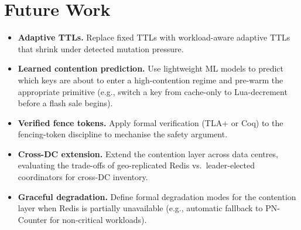 \documentclass[12pt,a4paper,oneside]{report}
\begin{document}
\section{Future Work}
\begin{itemize}[leftmargin=*]
    \item \textbf{Adaptive TTLs.} Replace fixed TTLs with workload-aware adaptive TTLs that shrink under detected mutation pressure.
    \item \textbf{Learned contention prediction.} Use lightweight ML models to predict which keys are about to enter a high-contention regime and pre-warm the appropriate primitive (e.g., switch a key from cache-only to Lua-decrement before a flash sale begins).
    \item \textbf{Verified fence tokens.} Apply formal verification (TLA+ or Coq) to the fencing-token discipline to mechanise the safety argument.
    \item \textbf{Cross-DC extension.} Extend the contention layer across data centres, evaluating the trade-offs of geo-replicated Redis vs.\ leader-elected coordinators for cross-DC inventory.
    \item \textbf{Graceful degradation.} Define formal degradation modes for the contention layer when Redis is partially unavailable (e.g., automatic fallback to PN-Counter for non-critical workloads).
\end{itemize}

\end{document}
